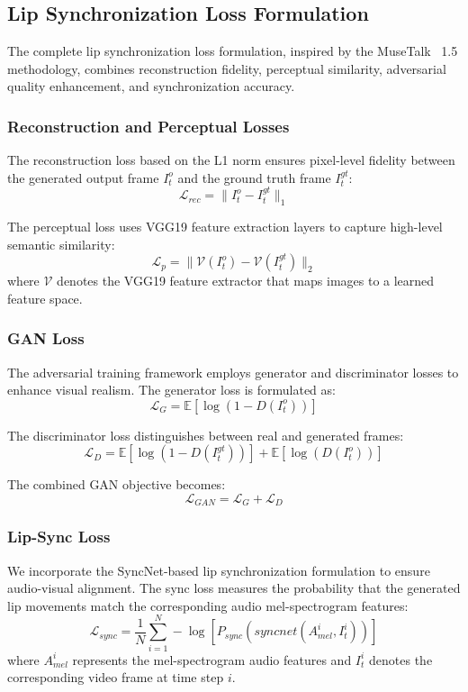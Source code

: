 \documentclass[12pt,oneside]{report}
\begin{document}
\subsection{Lip Synchronization Loss Formulation}

The complete lip synchronization loss formulation, inspired by the MuseTalk~\cite{zhang2023musetalk} 1.5 methodology, combines reconstruction fidelity, perceptual similarity, adversarial quality enhancement, and synchronization accuracy.

\subsubsection{Reconstruction and Perceptual Losses}
The reconstruction loss based on the L1 norm ensures pixel-level fidelity between the generated output frame $I_t^o$ and the ground truth frame $I_t^{gt}$:
\begin{equation}
\mathcal{L}_{rec} = \| I_t^o - I_t^{gt} \|_1
\end{equation}

The perceptual loss uses VGG19 feature extraction layers to capture high-level semantic similarity:
\begin{equation}
\mathcal{L}_p = \| \mathcal{V}(I_t^o) - \mathcal{V}(I_t^{gt}) \|_2
\end{equation}
where $\mathcal{V}$ denotes the VGG19 feature extractor that maps images to a learned feature space.

\subsubsection{GAN Loss}
The adversarial training framework employs generator and discriminator losses to enhance visual realism. The generator loss is formulated as:
\begin{equation}
\mathcal{L}_G = \mathbb{E}[\log(1 - D(I_t^o))]
\end{equation}

The discriminator loss distinguishes between real and generated frames:
\begin{equation}
\mathcal{L}_D = \mathbb{E}[\log(1 - D(I_t^{gt}))] + \mathbb{E}[\log(D(I_t^o))]
\end{equation}

The combined GAN objective becomes:
\begin{equation}
\mathcal{L}_{GAN} = \mathcal{L}_G + \mathcal{L}_D
\end{equation}

\subsubsection{Lip-Sync Loss}
We incorporate the SyncNet-based lip synchronization formulation to ensure audio-visual alignment. The sync loss measures the probability that the generated lip movements match the corresponding audio mel-spectrogram features:
\begin{equation}
\mathcal{L}_{sync} = \frac{1}{N} \sum_{i=1}^{N} -\log\left[P_{sync}(syncnet(A_{mel}^i, I_t^i))\right]
\end{equation}
where $A_{mel}^i$ represents the mel-spectrogram audio features and $I_t^i$ denotes the corresponding video frame at time step $i$.
\end{document}
